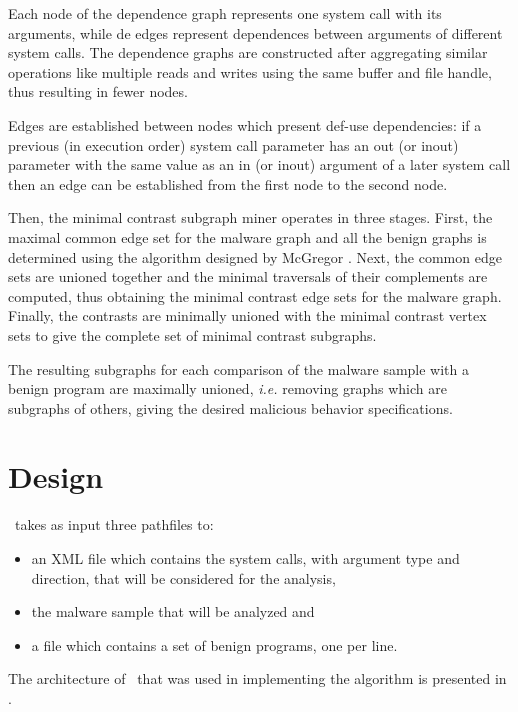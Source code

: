 
Each node of the dependence graph represents one system call with its arguments, while de edges represent dependences between arguments of different system calls. The dependence graphs are constructed after aggregating similar operations like multiple reads and writes using the same buffer and file handle, thus resulting in fewer nodes.

Edges are established between nodes which present def-use dependencies: if a previous (in execution order) system call parameter has an out (or inout) parameter with the same value as an in (or inout) argument of a later system call then an edge can be established from the first node to the second node.

Then, the minimal contrast subgraph miner operates in three stages. First, the maximal common edge set for the malware graph and all the benign graphs is determined using the algorithm designed by McGregor \cite{common-subgraph}. Next, the common edge sets are unioned together and the minimal traversals of their complements are computed, thus obtaining the minimal contrast edge sets for the malware graph. 
Finally, the contrasts are minimally unioned with the minimal contrast vertex sets to give the complete set of minimal contrast subgraphs.

The resulting subgraphs for each comparison of the malware sample with a benign program are maximally unioned, \textit{i.e.} removing graphs which are subgraphs of others, giving the desired malicious behavior specifications.

\section{Design}
\label{third:design}

\project\ takes as input three pathfiles to: 
\begin{itemize}
	\item an XML file which contains the system calls, with argument type and direction, that will be considered for the analysis,
	\item the malware sample that will be analyzed and
	\item a file which contains a set of benign programs, one per line.
\end{itemize}

The architecture of \project\ that was used in implementing the algorithm is presented in .

